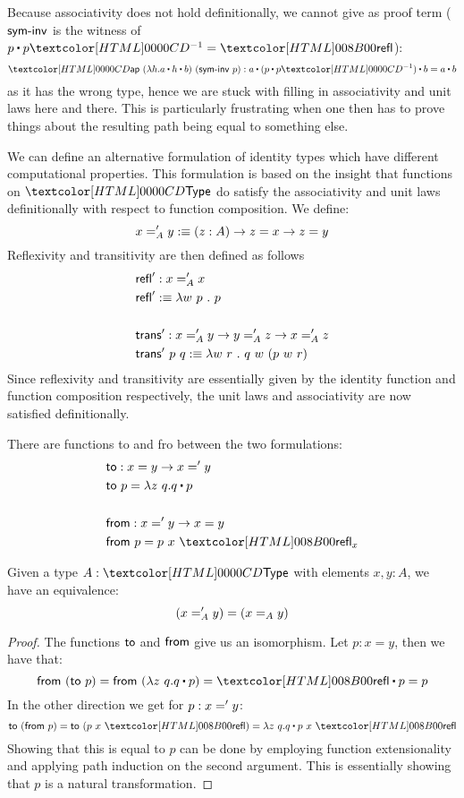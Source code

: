 Because associativity does not hold definitionally, we cannot give as
proof term ($\ident{sym-inv}$ is the witness of
$\trans{p}{\sym{p}} = \refl$):
$$
\ap\ (\lambda h . a \ct h \ct b)\ (\ident{sym-inv}\ p) : a \ct (p \ct \sym{p}) \ct b = a \ct b
$$
as it has the wrong type, hence we are stuck with filling in
associativity and unit laws here and there. This is particularly
frustrating when one then has to prove things about the resulting path
being equal to something else.

We can define an alternative formulation of identity types which have
different computational properties. This formulation is based on the
insight that functions on $\Type$ do satisfy the associativity and
unit laws definitionally with respect to function composition. We define:
$$
x ='_{A} y :\equiv (z : A) \to z = x \to z = y
$$
Reflexivity and transitivity are then defined as follows
%
\begin{align*}
&\ident{refl}' : x \alteq_{A} x \\
&\ident{refl}' \ddefeq \lambda w\ p\ .\ p \\
\\
&\ident{trans}' : x \alteq_{A} y \to y \alteq_{A} z \to x \alteq_{A} z \\
&\ident{trans}'\ p\ q \ddefeq \lambda w\ r\ .\ q\ w\ (p\ w\ r)
\end{align*}
%
Since reflexivity and transitivity are essentially given by the
identity function and function composition respectively, the unit laws
and associativity are now satisfied definitionally.

There are functions to and fro between the two formulations:
\begin{align*}
  &\ident{to} : x = y \to x \alteq y \\
  &\ident{to}\ p = \lambda z\ q . \trans{q}{p} \\
  \\
  &\ident{from} : x \alteq y \to x = y \\
  &\ident{from}\ p = p\ x\ \refl_{x}
\end{align*}

\begin{proposition}
  Given a type $A : \Type$ with elements $x, y : A$, we have an equivalence:
  $$
  (x ='_{A} y) = (x =_{A} y)
  $$
\end{proposition}

\begin{proof}
  The functions $\ident{to}$ and $\ident{from}$ give us an isomorphism. Let $p : x = y$, then we have that:
  $$
  \ident{from}\ (\ident{to}\ p) = \ident{from}\ (\lambda z\ q . \trans{q}{p}) = \trans{\refl}{p} = p
  $$
  In the other direction we get for $p : x =' y$:
  $$
  \ident{to}\ (\ident{from}\ p) = \ident{to}\ (p\ x\ \refl) = \lambda z\ q . \trans{q}{p\ x\ \refl}
  $$
  Showing that this is equal to $p$ can be done by employing function
  extensionality and applying path induction on the second
  argument. This is essentially showing that $p$ is a natural
  transformation.
\end{proof}

